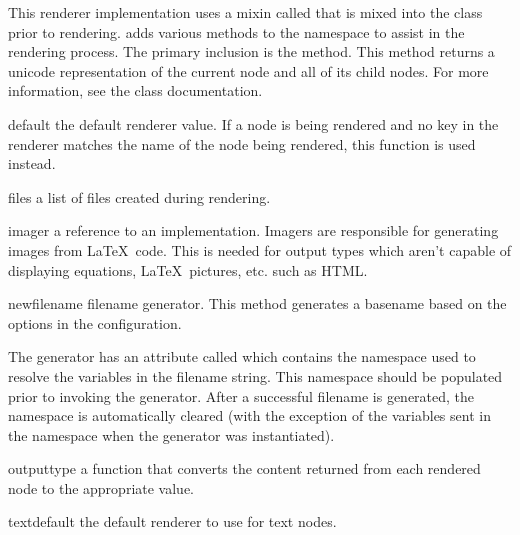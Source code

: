 This renderer implementation uses a mixin called  that
is mixed into the  class prior to rendering.  
adds various methods to the  namespace to assist in the
rendering process.  The primary inclusion is the 
method.  This method returns a unicode representation of the current node
and all of its child nodes.  For more information, see the 
class documentation.

\begin{memberdesc}[Renderer]{default}
the default renderer value.  If a node is being rendered and no key in
the renderer matches the name of the node being rendered, this 
function is used instead.
\end{memberdesc}

\begin{memberdesc}[Renderer]{files}
a list of files created during rendering.
\end{memberdesc}

\begin{memberdesc}[Renderer]{imager}
a reference to an  implementation.  Imagers are responsible
for generating images from \LaTeX\ code.  This is needed for output types 
which aren't capable of displaying equations, \LaTeX\ pictures, etc. such
as HTML.
\end{memberdesc}

\begin{memberdesc}[Renderer]{newfilename}
filename generator.  This method generates a basename based on the options
in the configuration.  

The generator has an attribute called  which contains the
namespace used to resolve the variables in the filename string.  This
namespace should be populated prior to invoking the generator.  After
a successful filename is generated, the namespace is automatically cleared
(with the exception of the variables sent in the namespace when the 
generator was instantiated).

\end{memberdesc}

\begin{memberdesc}[Renderer]{outputtype}
a function that converts the content returned from each rendered
node to the appropriate value.
\end{memberdesc}

\begin{memberdesc}[Renderer]{textdefault}
the default renderer to use for text nodes.
\end{memberdesc}


